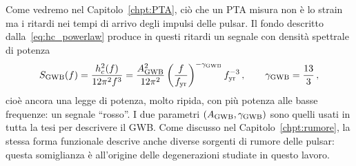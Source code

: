 Come vedremo nel Capitolo~\ref{chpt:PTA}, ciò che un PTA misura non è lo strain ma i ritardi nei tempi di arrivo degli impulsi delle pulsar. Il fondo descritto dalla~\eqref{eq:hc_powerlaw} produce in questi ritardi un segnale con densità spettrale di potenza~\cite{Taylor2021}
\begin{equation}
    S_{\mathrm{GWB}}(f) = \frac{h_c^2(f)}{12\pi^2 f^3} = \frac{A_{\mathrm{GWB}}^2}{12\pi^2}\left(\frac{f}{f_{\mathrm{yr}}}\right)^{-\gamma_{\mathrm{GWB}}} f_{\mathrm{yr}}^{-3}\, , \qquad \gamma_{\mathrm{GWB}} = \frac{13}{3}\, ,
    \label{eq:psd_gwb}
\end{equation}
cioè ancora una legge di potenza, molto ripida, con più potenza alle basse frequenze: un segnale ``rosso''. I due parametri $(A_{\mathrm{GWB}}, \gamma_{\mathrm{GWB}})$ sono quelli usati in tutta la tesi per descrivere il GWB. Come discusso nel Capitolo~\ref{chpt:rumore}, la stessa forma funzionale descrive anche diverse sorgenti di rumore delle pulsar: questa somiglianza è all'origine delle degenerazioni studiate in questo lavoro.
